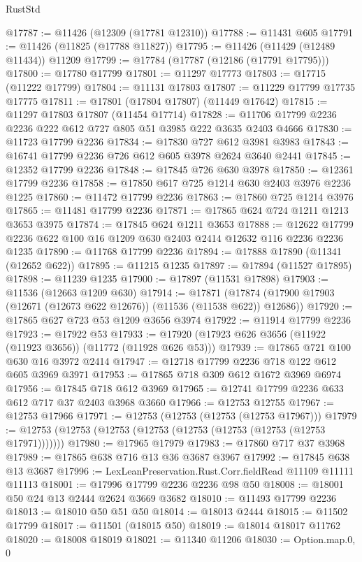 \begin{lexlean}{RustStd}
\begin{coremodule}
@17787 := @11426 (@12309 (@17781 @12310))
@17788 := @11431 @605
@17791 := @11426 (@11825 (@17788 @11827))
@17795 := @11426 (@11429 (@12489 @11434)) @11209
@17799 := @17784 (@17787 (@12186 (@17791 @17795)))
@17800 := @17780 @17799
@17801 := @11297 @17773
@17803 := @17715 (@11222 @17799)
@17804 := @11131 @17803
@17807 := @11229 @17799 @17735 @17775
@17811 := @17801 (@17804 @17807) (@11449 @17642)
@17815 := @11297 @17803 @17807 (@11454 @17714)
@17828 := @11706 @17799 @2236 @2236 @222 @612 @727 @805 @51 @3985 @222 @3635 @2403 @4666
@17830 := @11723 @17799 @2236
@17834 := @17830 @727 @612 @3981 @3983
@17843 := @16741 @17799 @2236 @726 @612 @605 @3978 @2624 @3640 @2441
@17845 := @12352 @17799 @2236
@17848 := @17845 @726 @630 @3978
@17850 := @12361 @17799 @2236
@17858 := @17850 @617 @725 @1214 @630 @2403 @3976 @2236 @1225
@17860 := @11472 @17799 @2236
@17863 := @17860 @725 @1214 @3976
@17865 := @11481 @17799 @2236
@17871 := @17865 @624 @724 @1211 @1213 @3653 @3975
@17874 := @17845 @624 @1211 @3653
@17888 := @12622 @17799 @2236 @622 @100 @16 @1209 @630 @2403 @2414 @12632 @116 @2236 @2236 @1235
@17890 := @11768 @17799 @2236
@17894 := @17888 @17890 (@11341 (@12652 @622))
@17895 := @11215 @1235
@17897 := @17894 (@11527 @17895)
@17898 := @11239 @1235
@17900 := @17897 (@11531 @17898)
@17903 := @11536 (@12663 @1209 @630)
@17914 := @17871
    (@17874 (@17900 @17903 (@12671 (@12673 @622 @12676)) (@11536 (@11538 @622)) @12686))
@17920 := @17865 @627 @723 @53 @1209 @3656 @3974
@17922 := @11914 @17799 @2236
@17923 := @17922 @53
@17933 := @17920 (@17923 @626 @3656 (@11922 (@11923 @3656)) (@11772 (@11928 @626 @53)))
@17939 := @17865 @721 @100 @630 @16 @3972 @2414
@17947 := @12718 @17799 @2236 @718 @122 @612 @605 @3969 @3971
@17953 := @17865 @718 @309 @612 @1672 @3969 @6974
@17956 := @17845 @718 @612 @3969
@17965 := @12741 @17799 @2236 @633 @612 @717 @37 @2403 @3968 @3660
@17966 := @12753 @12755
@17967 := @12753 @17966
@17971 := @12753 (@12753 (@12753 (@12753 @17967)))
@17979 := @12753 (@12753 (@12753 (@12753 (@12753 (@12753 (@12753 (@12753 @17971)))))))
@17980 := @17965 @17979
@17983 := @17860 @717 @37 @3968
@17989 := @17865 @638 @716 @13 @36 @3687 @3967
@17992 := @17845 @638 @13 @3687
@17996 := LexLeanPreservation.Rust.Corr.fieldRead @11109 @11111 @11113
@18001 := @17996 @17799 @2236 @2236 @98 @50
@18008 := @18001 @50 @24 @13 @2444 @2624 @3669 @3682
@18010 := @11493 @17799 @2236
@18013 := @18010 @50 @51 @50
@18014 := @18013 @2444
@18015 := @11502 @17799
@18017 := @11501 (@18015 @50)
@18019 := @18014 @18017 @11762
@18020 := @18008 @18019
@18021 := @11340 @11206
@18030 := Option.map.{0, 0}

\end{coremodule}
\end{lexlean}
